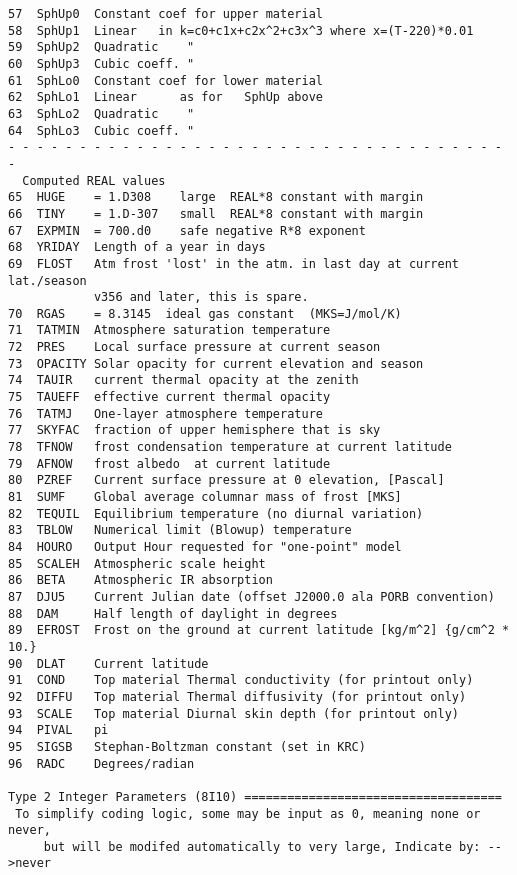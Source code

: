\documentclass{article}
\begin{document}
\begin{verbatim}
57  SphUp0  Constant coef for upper material 
58  SphUp1  Linear   in k=c0+c1x+c2x^2+c3x^3 where x=(T-220)*0.01
59  SphUp2  Quadratic    " 
60  SphUp3  Cubic coeff. "
61  SphLo0  Constant coef for lower material 
62  SphLo1  Linear      as for   SphUp above
63  SphLo2  Quadratic    "
64  SphLo3  Cubic coeff. "
- - - - - - - - - - - - - - - - - - - - - - - - - - - - - - - - - - - -
  Computed REAL values
65  HUGE    = 1.D308    large  REAL*8 constant with margin
66  TINY    = 1.D-307   small  REAL*8 constant with margin
67  EXPMIN  = 700.d0    safe negative R*8 exponent
68  YRIDAY  Length of a year in days
69  FLOST   Atm frost 'lost' in the atm. in last day at current lat./season
            v356 and later, this is spare.
70  RGAS    = 8.3145  ideal gas constant  (MKS=J/mol/K)
71  TATMIN  Atmosphere saturation temperature
72  PRES    Local surface pressure at current season
73  OPACITY Solar opacity for current elevation and season
74  TAUIR   current thermal opacity at the zenith
75  TAUEFF  effective current thermal opacity 
76  TATMJ   One-layer atmosphere temperature
77  SKYFAC  fraction of upper hemisphere that is sky
78  TFNOW   frost condensation temperature at current latitude
79  AFNOW   frost albedo  at current latitude
80  PZREF   Current surface pressure at 0 elevation, [Pascal]
81  SUMF    Global average columnar mass of frost [MKS]
82  TEQUIL  Equilibrium temperature (no diurnal variation)
83  TBLOW   Numerical limit (Blowup) temperature
84  HOURO   Output Hour requested for "one-point" model
85  SCALEH  Atmospheric scale height
86  BETA    Atmospheric IR absorption
87  DJU5    Current Julian date (offset J2000.0 ala PORB convention)
88  DAM     Half length of daylight in degrees
89  EFROST  Frost on the ground at current latitude [kg/m^2] {g/cm^2 * 10.} 
90  DLAT    Current latitude
91  COND    Top material Thermal conductivity (for printout only)
92  DIFFU   Top material Thermal diffusivity (for printout only)
93  SCALE   Top material Diurnal skin depth (for printout only)
94  PIVAL   pi
95  SIGSB   Stephan-Boltzman constant (set in KRC)
96  RADC    Degrees/radian

Type 2 Integer Parameters (8I10) ====================================
 To simplify coding logic, some may be input as 0, meaning none or never,
     but will be modifed automatically to very large, Indicate by: -->never 


\end{verbatim}
\end{document}
